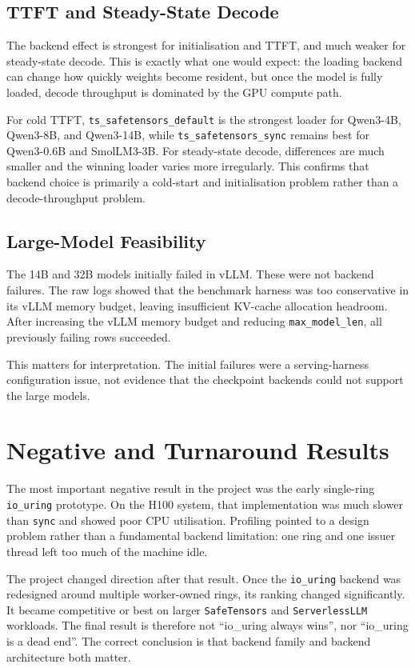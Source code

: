 \subsection{TTFT and Steady-State Decode}

The backend effect is strongest for initialisation and TTFT, and much weaker for steady-state decode. This is exactly what one would expect: the loading backend can change how quickly weights become resident, but once the model is fully loaded, decode throughput is dominated by the GPU compute path.

For cold TTFT, \texttt{ts\_safetensors\_default} is the strongest loader for Qwen3-4B, Qwen3-8B, and Qwen3-14B, while \texttt{ts\_safetensors\_sync} remains best for Qwen3-0.6B and SmolLM3-3B. For steady-state decode, differences are much smaller and the winning loader varies more irregularly. This confirms that backend choice is primarily a cold-start and initialisation problem rather than a decode-throughput problem.

\subsection{Large-Model Feasibility}

The 14B and 32B models initially failed in vLLM. These were not backend failures. The raw logs showed that the benchmark harness was too conservative in its vLLM memory budget, leaving insufficient KV-cache allocation headroom. After increasing the vLLM memory budget and reducing \texttt{max\_model\_len}, all previously failing rows succeeded.

This matters for interpretation. The initial failures were a serving-harness configuration issue, not evidence that the checkpoint backends could not support the large models.

\section{Negative and Turnaround Results}

The most important negative result in the project was the early single-ring \texttt{io\_uring} prototype. On the H100 system, that implementation was much slower than \texttt{sync} and showed poor CPU utilisation. Profiling pointed to a design problem rather than a fundamental backend limitation: one ring and one issuer thread left too much of the machine idle.

The project changed direction after that result. Once the \texttt{io\_uring} backend was redesigned around multiple worker-owned rings, its ranking changed significantly. It became competitive or best on larger \texttt{SafeTensors} and \texttt{ServerlessLLM} workloads. The final result is therefore not ``io\_uring always wins'', nor ``io\_uring is a dead end''. The correct conclusion is that backend family and backend architecture both matter.

